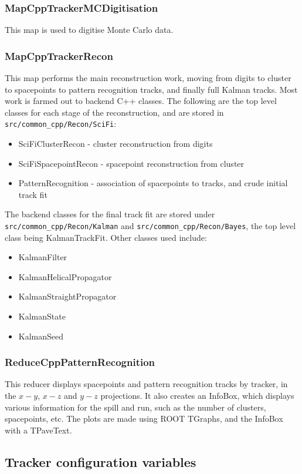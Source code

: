 \subsubsection{MapCppTrackerMCDigitisation}
This map is used to digitise Monte Carlo data.

\subsubsection{MapCppTrackerRecon}
This map performs the main reconstruction work, moving from digits to cluster to spacepoints to pattern recognition tracks, and finally full Kalman tracks. Most work is farmed out to backend C++ classes. The following are the top level classes for each stage of the reconstruction, and are stored in \verb;src/common_cpp/Recon/SciFi;:

\begin{itemize}
 \item SciFiClusterRecon - cluster reconstruction from digits
 \item SciFiSpacepointRecon - spacepoint reconstruction from cluster
 \item PatternRecognition - association of spacepoints to tracks, and crude initial track fit
\end{itemize}
The backend classes for the final track fit are stored under \verb;src/common_cpp/Recon/Kalman; and  \verb;src/common_cpp/Recon/Bayes;, the top level class being KalmanTrackFit. Other classes used include:

\begin{itemize}
 \item KalmanFilter
 \item KalmanHelicalPropagator
 \item KalmanStraightPropagator
 \item KalmanState
 \item KalmanSeed
\end{itemize}

\subsubsection{ReduceCppPatternRecognition}
This reducer displays spacepoints and pattern recognition tracks by tracker, in the $x-y$, $x-z$ and $y-z$ projections.  It also creates an InfoBox, which displays various information for the spill and run, such as the number of clusters, spacepoints, etc.  The plots are made using ROOT TGraphs, and the InfoBox with a TPaveText. 

\subsection{Tracker configuration variables}



